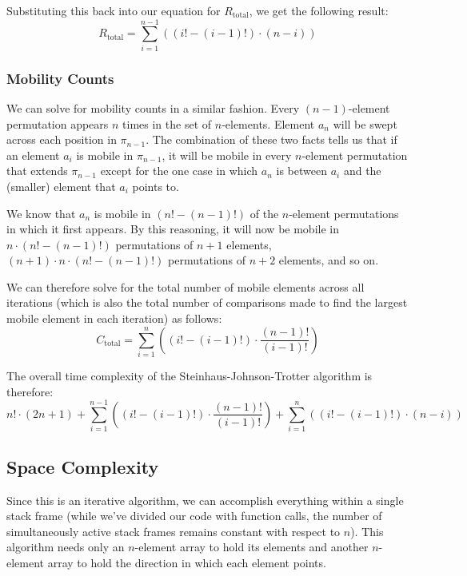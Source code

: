 \documentclass[10pt, oneside]{article}   	%
\begin{document}
Substituting this back into our equation for $R_{\text{total}}$, we get the following result:
\[
	R_{\text{total}} = \sum_{i = 1}^{n - 1} \left( \left( i! - (i - 1)! \right) \cdot \left( n - i \right) \right)
\]

\subsubsection{Mobility Counts}

We can solve for mobility counts in a similar fashion. Every $(n - 1)$-element permutation appears $n$ times in the set of $n$-elements. Element $a_{n}$ will be swept across each position in $\pi_{n - 1}$. The combination of these two facts tells us that if an element $a_{i}$ is mobile in $\pi_{n - 1}$, it will be mobile in every $n$-element permutation that extends $\pi_{n - 1}$ except for the one case in which $a_{n}$ is between $a_{i}$ and the (smaller) element that $a_{i}$ points to.

We know that $a_{n}$ is mobile in $(n! - (n - 1)!)$ of the $n$-element permutations in which it first appears. By this reasoning, it will now be mobile in $n \cdot (n! - (n - 1)!)$ permutations of $n + 1$ elements, $(n + 1) \cdot n \cdot (n! - (n - 1)!)$ permutations of $n + 2$ elements, and so on.

We can therefore solve for the total number of mobile elements across all iterations (which is also the total number of comparisons made to find the largest mobile element in each iteration) as follows:
\[
	C_{\text{total}} = \sum_{i = 1}^{n} \left( \left( i! - (i - 1)! \right) \cdot \frac{(n - 1)!}{(i - 1)!} \right)
\]

The overall time complexity of the Steinhaus-Johnson-Trotter algorithm is therefore:
\[
	n! \cdot (2n + 1)+ \sum_{i = 1}^{n - 1} \left( \left( i! - (i - 1)! \right) \cdot \frac{(n - 1)!}{(i - 1)!} \right) + \sum_{i = 1}^{n} \left( \left(i! - (i - 1)! \right) \cdot \left( n - i \right) \right) 
\]

\subsection{Space Complexity}

Since this is an iterative algorithm, we can accomplish everything within a single stack frame (while we've divided our code with function calls, the number of simultaneously active stack frames remains constant with respect to $n$). This algorithm needs only an $n$-element array to hold its elements and another $n$-element array to hold the direction in which each element points.
\end{document}

